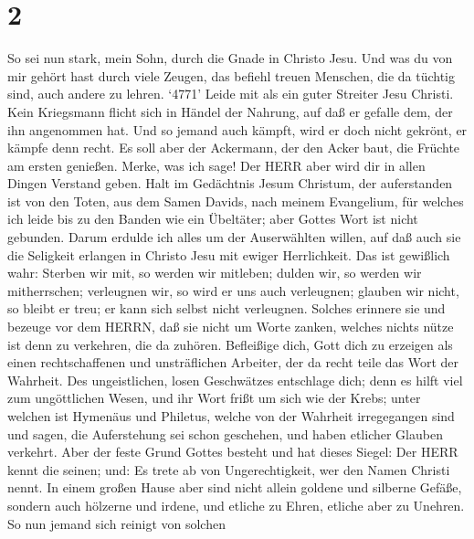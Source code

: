 \hypertarget{section-1}{%
\section{2}\label{section-1}}

 So sei nun stark, mein Sohn, durch die Gnade in Christo
Jesu.  Und was du von mir gehört hast durch viele Zeugen,
das befiehl treuen Menschen, die da tüchtig sind, auch andere zu lehren.
 `4771' Leide mit als ein guter Streiter Jesu Christi.
 Kein Kriegsmann flicht sich in Händel der Nahrung, auf daß
er gefalle dem, der ihn angenommen hat.  Und so jemand auch
kämpft, wird er doch nicht gekrönt, er kämpfe denn recht. 
Es soll aber der Ackermann, der den Acker baut, die Früchte am ersten
genießen. Merke, was ich sage!  Der HERR aber wird dir in
allen Dingen Verstand geben.  Halt im Gedächtnis Jesum
Christum, der auferstanden ist von den Toten, aus dem Samen Davids, nach
meinem Evangelium,  für welches ich leide bis zu den Banden
wie ein Übeltäter; aber Gottes Wort ist nicht gebunden. 
Darum erdulde ich alles um der Auserwählten willen, auf daß auch sie die
Seligkeit erlangen in Christo Jesu mit ewiger Herrlichkeit.
 Das ist gewißlich wahr: Sterben wir mit, so werden wir
mitleben;  dulden wir, so werden wir mitherrschen;
verleugnen wir, so wird er uns auch verleugnen;  glauben
wir nicht, so bleibt er treu; er kann sich selbst nicht verleugnen.
 Solches erinnere sie und bezeuge vor dem HERRN, daß sie
nicht um Worte zanken, welches nichts nütze ist denn zu verkehren, die
da zuhören.  Befleißige dich, Gott dich zu erzeigen als
einen rechtschaffenen und unsträflichen Arbeiter, der da recht teile das
Wort der Wahrheit.  Des ungeistlichen, losen Geschwätzes
entschlage dich; denn es hilft viel zum ungöttlichen Wesen,
 und ihr Wort frißt um sich wie der Krebs; unter welchen
ist Hymenäus und Philetus,  welche von der Wahrheit
irregegangen sind und sagen, die Auferstehung sei schon geschehen, und
haben etlicher Glauben verkehrt.  Aber der feste Grund
Gottes besteht und hat dieses Siegel: Der HERR kennt die seinen; und: Es
trete ab von Ungerechtigkeit, wer den Namen Christi nennt. 
In einem großen Hause aber sind nicht allein goldene und silberne
Gefäße, sondern auch hölzerne und irdene, und etliche zu Ehren, etliche
aber zu Unehren.  So nun jemand sich reinigt von solchen
